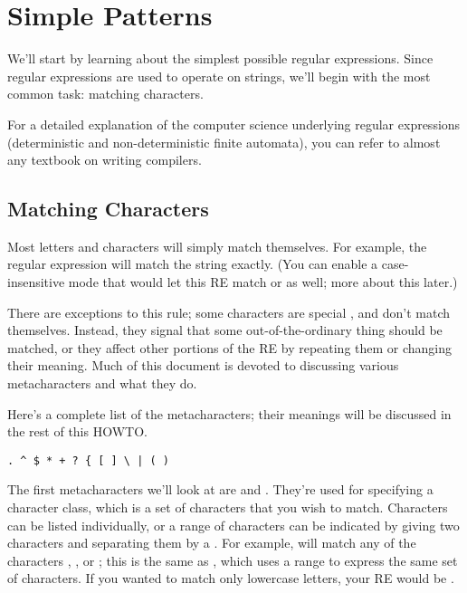 \documentclass{howto}
\begin{document}
\section{Simple Patterns}

We'll start by learning about the simplest possible regular
expressions.  Since regular expressions are used to operate on
strings, we'll begin with the most common task: matching characters.

For a detailed explanation of the computer science underlying regular
expressions (deterministic and non-deterministic finite automata), you
can refer to almost any textbook on writing compilers.

\subsection{Matching Characters}

Most letters and characters will simply match themselves.  For
example, the regular expression  will match the string
 exactly.  (You can enable a case-insensitive mode that
would let this RE match  or  as well; more
about this later.)  

There are exceptions to this rule; some characters are special
, and don't match themselves.  Instead, they
signal that some out-of-the-ordinary thing should be matched, or they
affect other portions of the RE by repeating them or changing their
meaning.  Much of this document is devoted to discussing various
metacharacters and what they do.

Here's a complete list of the metacharacters; their meanings will be
discussed in the rest of this HOWTO.

\begin{verbatim}
. ^ $ * + ? { [ ] \ | ( )
\end{verbatim}

The first metacharacters we'll look at are \samp{[} and \samp{]}.
They're used for specifying a character class, which is a set of
characters that you wish to match.  Characters can be listed
individually, or a range of characters can be indicated by giving two
characters and separating them by a \character{-}.  For example,
\regexp{[abc]} will match any of the characters , , or
; this is the same as
\regexp{[a-c]}, which uses a range to express the same set of
characters.  If you wanted to match only lowercase letters, your
RE would be \regexp{[a-z]}.
\end{document}
